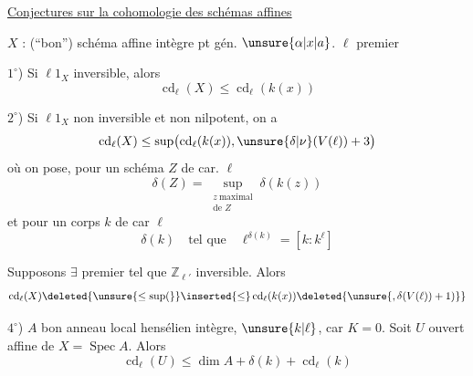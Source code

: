 \uline{Conjectures sur la cohomologie des schémas affines}

$X$ : (``bon'') schéma affine intègre pt gén. $\unsure{\alpha|x|a}$.
$\ell$  premier

$1^\circ$) Si $\ell 1_X$ inversible, alors
\[
\operatorname{cd}_{\ell}(X)\leq\operatorname{cd}_{\ell}(k(x))
\]
\margin{\deleted{\unsure{[}} [et cela devient une égalité pour les ouverts assez petits ?]}

$2^\circ$) Si $\ell 1_X$ non inversible et non nilpotent, on a
\[
\operatorname{cd}_{\ell}(X)\leq\sup\bigl(\operatorname{cd}_{\ell}(k(x)),\unsure{\delta|\nu}(V(\ell))+3\bigr)
\]
où on pose, pour un schéma $Z$ de car. $\ell$
\[
\delta(Z)=\sup_{\substack{z\ \text{maximal}\\\text{de }Z}}\delta(k(z))
\]
et pour un corps $k$ de car $\ell$
\[
\delta(k)\quad\text{tel que}\quad \ell^{\delta(k)}=[k:k^\ell]
\]


Supposons $\exists$ 
premier tel que $\mathbb Z_{\ell'}$ inversible. Alors
\[
\operatorname{cd}_{\ell}(X)\deleted{\unsure{\leq\sup(}}\inserted{\leq}\operatorname{cd}_{\ell}(k(x))\deleted{\unsure{,\delta(V(\ell))+1)}}
\]

$4^\circ$) $A$ bon anneau local hensélien intègre,   $\unsure{k|\ell}$,
car $K=0$. Soit $U$ ouvert affine de $X=\operatorname{Spec} A$. Alors
\[
\operatorname{cd}_{\ell}(U)\leq\dim A+\delta(k)+\operatorname{cd}_{\ell}(k)
\]
